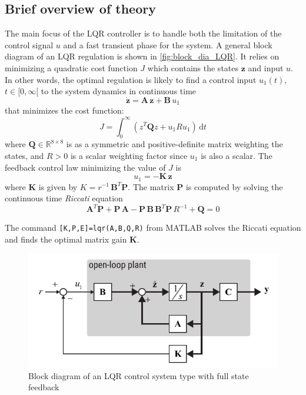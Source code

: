 \documentclass[a4paper,12pt]{article}
\begin{document}
\subsection{Brief overview of theory}
The main focus of the LQR controller is to handle both the limitation of the control signal $u$ and a fast transient phase for the system. A general block diagram of an LQR regulation is shown in \autoref{fig:block_dia_LQR}. It relies on minimizing a quadratic cost function $J$ which contains the states $\mathbf{z}$ and input $u$. In other words, the optimal regulation is likely to find a control input $u_1(t)$, $t\in[0,\infty[$ to the system dynamics in continuous time 
\[\dot{\mathbf{z}}=\mathbf{A}\,\mathbf{z}+\mathbf{B}\,u_1\]
that minimizes the cost function:
\[
J = \int^\infty_0 \left( z^T\mathbf{Q}z + u_1 R u_1 \right)\, \text{d}t
\]
where $\mathbf{Q}\in \mathbb{R}^{8\times8}$ is as a symmetric and positive-definite matrix weighting the states, and $R>0$ is a scalar weighting factor since $u_1$ is also a scalar. The feedback control law minimizing the value of $J$ is
\[u_1 = -\mathbf{K}\,\mathbf{z}\]
where $\mathbf{K}$ is given by $K=r^{-1}\,\mathbf{B}^T\mathbf{P}$. The matrix $\mathbf{P}$ is computed by solving the continuous time \emph{Riccati} equation
\[
\mathbf{A}^T\mathbf{P} + \mathbf{P\,A} - \mathbf{P\,B\,B}^T \mathbf{P}\,R^{-1} + \mathbf{Q} = 0
\]

The command \texttt{[K,P,E]=lqr(A,B,Q,R)} from MATLAB solves the Riccati equation and finds the optimal matrix gain $\mathbf{K}$.
\begin{figure}[h]
	\centering
	\includegraphics[width=13cm]{illustrations/block_dia_LQR.pdf}
	\caption{Block diagram of an LQR control system type with full state feedback}
	\label{fig:block_dia_LQR}
\end{figure}
\end{document}
